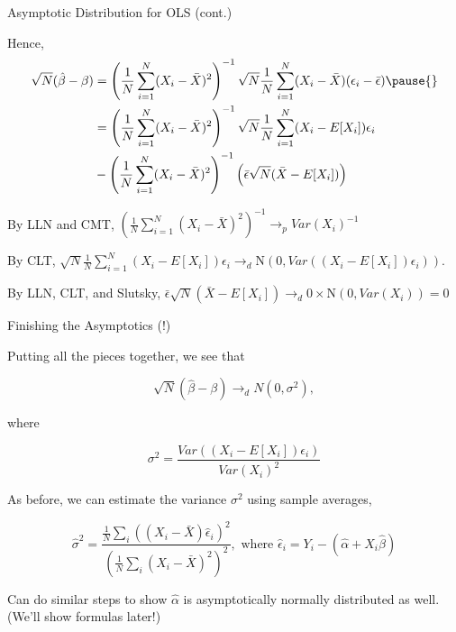 \documentclass[11pt,english,handout]{beamer}
\newenvironment{wideitemize}{\itemize\addtolength{\itemsep}{10pt}}{\enditemize}
\begin{document}
\begin{frame}{Asymptotic Distribution for OLS (cont.)}
\begin{wideitemize}
	\item	Hence,
	\begin{align*}
		\sqrt{N}(\hat\beta - \beta) &= \left( \frac{1}{N} \sum_{i=1}^N (X_i - \bar{X})^2 \right)^{-1}  \sqrt{N} \frac{1}{N} \sum_{i=1}^N (X_i - \bar{X})(\epsilon_i - \bar{\epsilon}) \pause{} \\
		&= \left( \frac{1}{N} \sum_{i=1}^N (X_i - \bar{X})^2 \right)^{-1} \sqrt{N}\frac{1}{N} \sum_{i=1}^N (X_i - E[X_i])\epsilon_i \\
		&-\left( \frac{1}{N} \sum_{i=1}^N (X_i - \bar{X})^2 \right)^{-1}  \left( \bar{\epsilon} \sqrt{N} (\bar{X} - E[X_i]) \right)
	\end{align*}

	\item
	By LLN and CMT, $\left( \frac{1}{N} \sum_{i=1}^N (X_i - \bar{X})^2 \right)^{-1} \rightarrow_p Var(X_i)^{-1}$
	
	\pause
	\item
	By CLT, $\sqrt{N}\frac{1}{N} \sum_{i=1}^N (X_i - E[X_i])\epsilon_i \rightarrow_d \mathrm{N}(0, Var((X_i - E[X_i])\epsilon_i)).$
	
	\pause
	\item
	By LLN, CLT, and Slutsky,  $\bar{\epsilon} \sqrt{N} (\bar{X} - E[X_i]) \rightarrow_d 0 \times \mathrm{N}(0, Var(X_i))  = 0$
	
\end{wideitemize}

\end{frame}

\begin{frame}{Finishing the Asymptotics (!)}
	
	\begin{wideitemize}
	\item
	Putting all the pieces together, we see that
	
	$$\sqrt{N}(\hat\beta - \beta) \rightarrow_d N(0, \sigma^2),$$
	
	\noindent where
	
	$$\sigma^2 = \dfrac{  Var((X_i - E[X_i])\epsilon_i) }{ Var(X_i)^2  }$$ 
	
	\item
	As before, we can estimate the variance $\sigma^2$ using sample averages,
	
	$$\hat\sigma^2 = \dfrac{  \frac{1}{N} \sum_i ((X_i - \bar{X})\hat\epsilon_i )^2}{ \left(\frac{1}{N} \sum_i (X_i - \bar{X})^2\right)^2  }, \text{ where } \hat\epsilon_i = Y_i - (\hat\alpha + X_i \hat\beta)$$ 
	
	
	\item
	\pause
	Can do similar steps to show $\hat\alpha$ is asymptotically normally distributed as well. (We'll show formulas later!)
\end{wideitemize}	
\end{frame}
		
\end{document}
